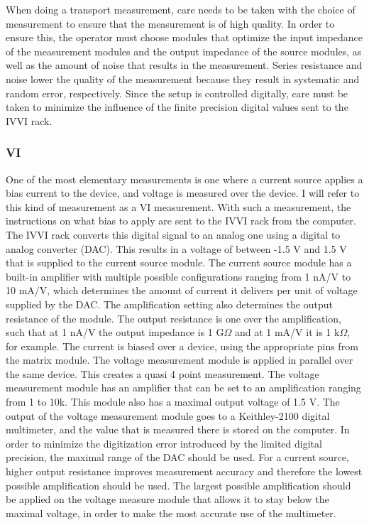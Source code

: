 When doing a transport measurement, care needs to be taken with the choice of measurement to ensure that the measurement is of high quality. In order to ensure this, the operator must choose modules that optimize the input impedance of the measurement modules and the output impedance of the source modules, as well as the amount of noise that results in the measurement. Series resistance and noise lower the quality of the measurement because they result in systematic and random error, respectively. Since the setup is controlled digitally, care must be taken to minimize the influence of the finite precision digital values sent to the IVVI rack.\\

\subsubsection{VI}
One of the most elementary measurements is one where a current source applies a bias current to the device, and voltage is measured over the device. I will refer to this kind of measurement as a VI measurement. With such a measurement, the instructions on what bias to apply are sent to the IVVI rack from the computer. The IVVI rack converts this digital signal to an analog one using a digital to analog converter (DAC). This results in a voltage of between -1.5 V and 1.5 V that is supplied to the current source module. The current source module has a built-in amplifier with multiple possible configurations ranging from 1 nA/V to 10 mA/V, which determines the amount of current it delivers per unit of voltage supplied by the DAC. The amplification setting also determines the output resistance of the module. The output resistance is one over the amplification, such that at 1 nA/V the output impedance is 1 G$\Omega$ and at 1 mA/V it is 1 k$\Omega$, for example. The current is biased over a device, using the appropriate pins from the matrix module. The voltage measurement module is applied in parallel over the same device. This creates a quasi 4 point measurement. The voltage measurement module has an amplifier that can be set to an amplification ranging from 1 to 10k. This module also has a maximal output voltage of 1.5 V. The output of the voltage measurement module goes to a Keithley-2100 digital multimeter, and the value that is measured there is stored on the computer. In order to minimize the digitization error introduced by the limited digital precision, the maximal range of the DAC should be used. For a current source, higher output resistance improves measurement accuracy and therefore the lowest possible amplification should be used. The largest possible amplification should be applied on the voltage measure module that allows it to stay below the maximal voltage, in order to make the most accurate use of the multimeter. 

